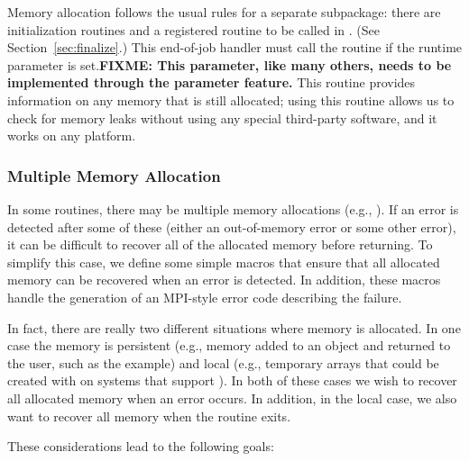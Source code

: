 \documentclass{article}
\def\fixme#1{\marginpar{FIXME:}\textbf{FIXME: #1}}
\begin{document}
Memory allocation follows the usual rules for a separate subpackage: there are
initialization routines and a registered routine to be called in
. (See Section~\ref{sec:finalize}.)  
This end-of-job
handler must call the 
routine  if the runtime parameter
 is set.\fixme{This parameter,
  like many others, needs to be implemented through the parameter
  feature.}
This routine
provides information on any memory that is still allocated; using this
routine allows us to check for memory leaks without using any special
third-party software, and it works on any platform.



\subsubsection{Multiple Memory Allocation}

In some routines, there may be multiple memory allocations (e.g.,
).  If an error is 
detected after some of these (either an out-of-memory error or some other
error), it can be difficult to recover all of the allocated memory before
returning.  
To simplify this case, we define some simple macros that ensure that all
allocated memory can be recovered when an error is detected.  
In addition, these macros handle the generation of an MPI-style error code
describing the failure.

In fact, there are really two different situations where memory is allocated.
In one case the memory is persistent (e.g.,
memory added to an object and returned to the user, such as the
 example) and local (e.g., temporary
arrays that could be created with  on systems that support
).  In both of these cases we wish to recover all allocated
memory when an error occurs.  In addition, in the local case, we also want
to recover all memory when the routine exits.

These considerations lead to the following goals: 
\end{document}
